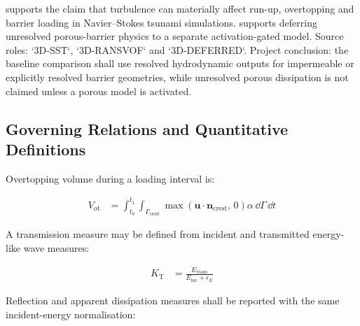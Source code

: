 %

\textcite{kozelkov2022turbulence} supports the claim that turbulence
can materially affect run-up, overtopping and barrier loading in
Navier--Stokes tsunami simulations. \textcite{deljesus2012porous}
supports deferring unresolved porous-barrier physics to a separate
activation-gated model. Source roles: `3D-SST`, `3D-RANSVOF` and
`3D-DEFERRED`. Project conclusion: the baseline comparison shall use
resolved hydrodynamic outputs for impermeable or explicitly resolved
barrier geometries, while unresolved porous dissipation is not claimed
unless a porous model is activated.

\subsection{Governing Relations and Quantitative Definitions}
\label{sec:res-phy-bar-governing-relations}

%

Overtopping volume during a loading interval is:

\begin{align}
  V_{\mathrm{ot}}
  &=
  \int_{t_0}^{t_1}
  \int_{\Gamma_{\mathrm{crest}}}
  \max
  \left(
    \mathbf{u}\cdot\mathbf{n}_{\mathrm{crest}},\,
    0
  \right)
  \alpha
  \,\dd\Gamma
  \,\dd t
  \label{eq:res-phy-bar-overtopping-volume}
\end{align}

A transmission measure may be defined from incident and transmitted
energy-like wave measures:

\begin{align}
  K_{\mathrm{T}}
  &=
  \frac{
    E_{\mathrm{trans}}
  }{
    E_{\mathrm{inc}}
    +
    \epsilon_E
  }
  \label{eq:res-phy-bar-transmission-measure}
\end{align}

Reflection and apparent dissipation measures shall be reported with
the same incident-energy normalisation:

